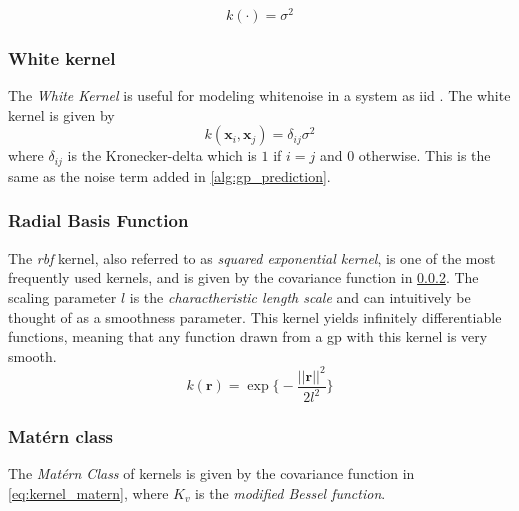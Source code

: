 \begin{equation}
    k(\boldsymbol{\cdot}) = \sigma^2
\end{equation}

\subsubsection{White kernel}
The \textit{White Kernel} is useful for modeling whitenoise in a system as \acrshort{iid} \cite{scikit-learn}. The white kernel is given by
\begin{equation}
    k(\boldsymbol{x}_i, \boldsymbol{x}_j) = \delta_{ij} \sigma^2
\end{equation}
where $\delta_{ij}$ is the Kronecker-delta which is $1$ if $i=j$ and $0$ otherwise. This is the same as the noise term added in \cref{alg:gp_prediction}.

\subsubsection{Radial Basis Function}\label{sec:kernels_rbf}
The \textit{\acrfull{rbf}} kernel, also referred to as \textit{squared exponential kernel}, is one of the most frequently used kernels, and is given by the covariance function in \cref{sec:kernels_rbf}. The scaling parameter $l$ is the \textit{charactheristic length scale} and can intuitively be thought of as a smoothness parameter. This kernel yields infinitely differentiable functions, meaning that any function drawn from a \acrshort{gp} with this kernel is very smooth\cite{rasmussen}.
\begin{equation}\label{eq:kernel_rbf}
    k(\boldsymbol{r}) = \exp \big\{-\frac{||\boldsymbol{r}||^2}{2 l^2}\big\}
\end{equation} 

\subsubsection{Matérn class}
The \textit{Matérn Class} of kernels is given by the covariance function in \cref{eq:kernel_matern}, where $K_v$ is the \textit{modified Bessel function}. 

